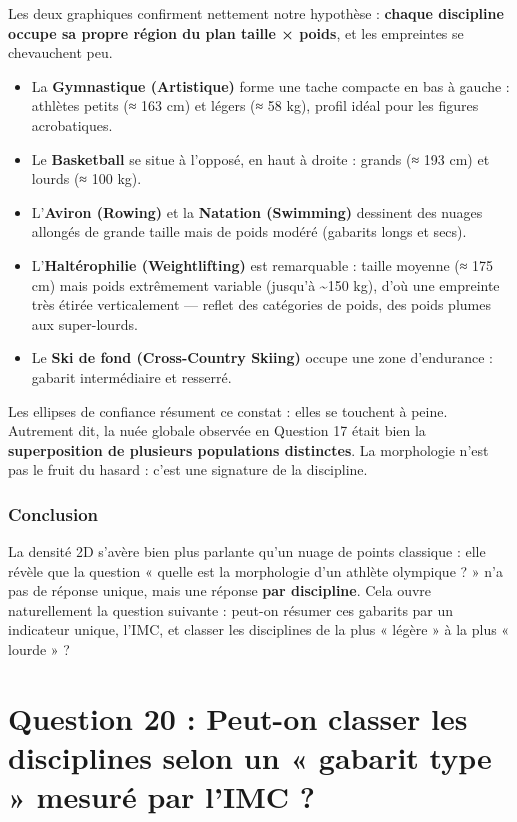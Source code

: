 \documentclass[
]{article}
\providecommand{\tightlist}{%
  \setlength{\itemsep}{0pt}\setlength{\parskip}{0pt}}
\begin{document}
Les deux graphiques confirment nettement notre hypothèse :
\textbf{chaque discipline occupe sa propre région du plan taille ×
poids}, et les empreintes se chevauchent peu.

\begin{itemize}
\tightlist
\item
  La \textbf{Gymnastique (Artistique)} forme une tache compacte en bas à
  gauche : athlètes petits (≈ 163 cm) et légers (≈ 58 kg), profil idéal
  pour les figures acrobatiques.
\item
  Le \textbf{Basketball} se situe à l'opposé, en haut à droite : grands
  (≈ 193 cm) et lourds (≈ 100 kg).
\item
  L'\textbf{Aviron (Rowing)} et la \textbf{Natation (Swimming)}
  dessinent des nuages allongés de grande taille mais de poids modéré
  (gabarits longs et secs).
\item
  L'\textbf{Haltérophilie (Weightlifting)} est remarquable : taille
  moyenne (≈ 175 cm) mais poids extrêmement variable (jusqu'à
  \textasciitilde150 kg), d'où une empreinte très étirée verticalement
  --- reflet des catégories de poids, des poids plumes aux super-lourds.
\item
  Le \textbf{Ski de fond (Cross-Country Skiing)} occupe une zone
  d'endurance : gabarit intermédiaire et resserré.
\end{itemize}

Les ellipses de confiance résument ce constat : elles se touchent à
peine. Autrement dit, la nuée globale observée en Question 17 était bien
la \textbf{superposition de plusieurs populations distinctes}. La
morphologie n'est pas le fruit du hasard : c'est une signature de la
discipline.

\subsubsection{Conclusion}\label{conclusion-2}

La densité 2D s'avère bien plus parlante qu'un nuage de points classique
: elle révèle que la question « quelle est la morphologie d'un athlète
olympique ? » n'a pas de réponse unique, mais une réponse \textbf{par
discipline}. Cela ouvre naturellement la question suivante : peut-on
résumer ces gabarits par un indicateur unique, l'IMC, et classer les
disciplines de la plus « légère » à la plus « lourde » ?

\section{Question 20 : Peut-on classer les disciplines selon un «
gabarit type » mesuré par l'IMC
?}\label{question-20-peut-on-classer-les-disciplines-selon-un-gabarit-type-mesuruxe9-par-limc}
\end{document}
